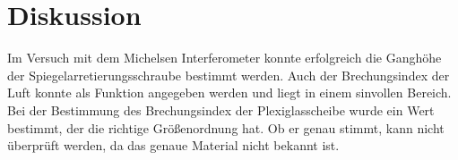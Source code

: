 \documentclass[11pt, a4paper]{article}
\begin{document}
    \section{Diskussion}
    Im Versuch mit dem Michelsen Interferometer konnte erfolgreich die Ganghöhe der Spiegelarretierungsschraube bestimmt werden.
    Auch der Brechungsindex der Luft konnte als Funktion angegeben werden und liegt in einem sinvollen Bereich.
    Bei der Bestimmung des Brechungsindex der Plexiglasscheibe wurde ein Wert bestimmt, der die richtige Größenordnung hat. Ob er genau stimmt, kann nicht überprüft werden, da das genaue Material nicht bekannt ist.
    
    
\end{document}
